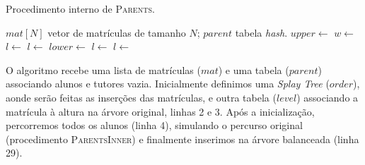 \begin{algorithm}[ht]
  \small
  \caption{Procedimento interno de \textsc{Parents}.}
  \label{alg:parent_inner}
  \begin{algorithmic}[1]
    \Require $mat[N]$ vetor de matrículas de tamanho $N$; $parent$ tabela \textit{hash}.
    \State $upper \gets$ 
    \Statex
    \State $w \gets$  
    \State $l \gets$  
    \State {} 
    \State {}
    \Statex
     
    \State $l \gets$ 
    \State {}
    \State {}
    \Statex
    \Else
    \State $lower \gets$  
    \Statex
    \State $l \gets$ 
    \State {}
    \State {}
    \Statex
    \Else
    \State $l \gets$ 
    \State {}
    \State {}
    \EndIf
    \EndIf {}
    
    \EndProcedure
  \end{algorithmic}
\end{algorithm}

O algoritmo recebe uma lista de matrículas ($mat$) e uma tabela ($parent$) associando alunos e
tutores vazia. Inicialmente definimos uma \textit{Splay Tree} ($order$), aonde
serão feitas as inserções das matrículas, e outra tabela ($level$) associando a matrícula à
altura na árvore original, linhas 2 e 3. Após a inicialização, percorremos todos
os alunos (linha 4), simulando o percurso original (procedimento \textsc{ParentsInner}) e finalmente
inserimos na árvore balanceada (linha 29).

